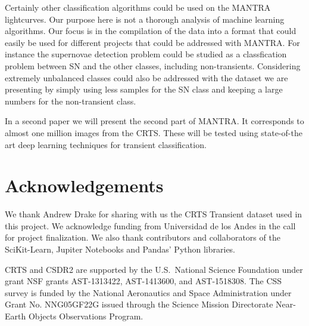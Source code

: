 \documentclass[twocolumn]{aastex62}
\begin{document}
Certainly other classification algorithms could be used on the MANTRA
lightcurves. Our purpose here is not a thorough analysis of machine
learning algorithms. Our focus is in the compilation of the data into
a format that could easily be used for different projects that could
be addressed with MANTRA. 
For instance the supernovae detection problem could be studied as a
classfication problem between SN and the other classes, including
non-transients. 
Considering extremely unbalanced classes could also be addressed
with the dataset we are presenting by simply using less samples for
the SN class and keeping a large numbers for the non-transient class.  


In a second paper we will present the second part of MANTRA.
It corresponds to almost one million images from the CRTS.
These will be tested using state-of-the art deep learning techniques
for transient classification.  

\section*{Acknowledgements}

We thank Andrew Drake for sharing with us the CRTS Transient dataset
used in this project.  
We acknowledge funding from Universidad de los Andes in the call for
project finalization.
We also thank contributors and collaborators of the SciKit-Learn,
Jupiter Notebooks and Pandas' Python libraries.  

CRTS and CSDR2 are supported by the U.S.~National Science 
Foundation under grant NSF grants AST-1313422, AST-1413600, and 
AST-1518308.  The CSS survey is funded by the National Aeronautics
and Space Administration under Grant No. NNG05GF22G issued through
the Science Mission Directorate Near-Earth Objects Observations Program.



\end{document}
